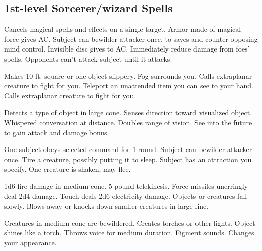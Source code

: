 \subsection{1st-level Sorcerer/wizard Spells}
\begin{swspelllist}
   Cancels magical spells and effects on a single target.
   Armor made of magical force gives  AC.
   Subject can bewilder attacker once.
    to saves and counter opposing mind control.
   Invisible disc gives  to AC.
   Immediately reduce damage from foes' spells.
   Opponents can't attack subject until it attacks.

   Makes 10 ft. square or one object slippery.
   Fog surrounds you.
   Calls extraplanar creature to fight for you.
   Teleport an unattended item you can see to your hand.
   Calls extraplanar creature to fight for you.

   Detects a type of object in large cone.
   Senses direction toward visualized object.
   Whispered conversation at distance.
   Doubles range of vision.
   See into the future to gain attack and damage bonus.

   One subject obeys selected command for 1 round.
   Subject can bewilder attacker once.
   Tire a creature, possibly putting it to sleep.
   Subject has an attraction you specify.
   One creature is shaken, may flee.

   1d6 fire damage in medium cone.
   5-pound telekinesis.
   Force missiles unerringly deal 2d4 damage.
   Touch deals 2d6 electricity damage.
   Objects or creatures fall slowly.
   Blows away or knocks down smaller creatures in large line.

   Creatures in medium cone are bewildered.
   Creates torches or other lights.
   Object shines like a torch.
   Throws voice for medium duration.
   Figment sounds.
   Changes your appearance.


\end{swspelllist}

